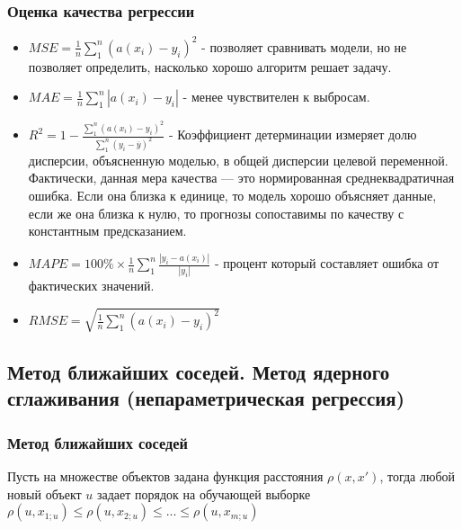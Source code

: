 \documentclass{article}
\begin{document}
\subsubsection{Оценка качества регрессии}

\begin{itemize}
	\item $MSE = \frac{1}{n} \sum\limits_1^n (a(x_i) - y_i)^2$ - позволяет сравнивать модели, но
	не позволяет определить, насколько хорошо алгоритм решает задачу.
	\item $MAE = \frac{1}{n} \sum\limits_1^n |a(x_i) - y_i|$ - менее чувствителен к выбросам.
	\item $R^2 = 1 - \frac{\sum\limits_1^n (a(x_i) - y_i)^2}{\sum\limits_1^n (y_i - \overline{y})^2}$ -
	Коэффициент детерминации измеряет долю дисперсии, объясненную моделью, в общей дисперсии целевой
	переменной. Фактически, данная мера качества — это нормированная среднеквадратичная ошибка. Если
	она близка к единице, то модель хорошо объясняет данные, если же она близка к нулю, то прогнозы
	сопоставимы по качеству с константным предсказанием.
	\item $MAPE = 100\% \times \frac{1}{n}\sum\limits_1^n \frac{|y_i - a(x_i)|}{|y_i|}$ - процент
	который составляет ошибка от фактических значений.
	\item $RMSE = \sqrt{\frac{1}{n} \sum\limits_1^n (a(x_i) - y_i)^2}$
\end{itemize}


\subsection{Метод ближайших соседей. Метод ядерного сглаживания (непараметрическая
регрессия)}

\subsubsection{Метод ближайших соседей}


Пусть на множестве объектов задана функция расстояния $\rho(x, x')$, тогда
любой новый объект $u$ задает порядок на обучающей выборке
$\rho(u, x_{1; u}) \leq \rho(u, x_{2; u}) \leq ... \leq \rho(u, x_{m; u})$
\end{document}
